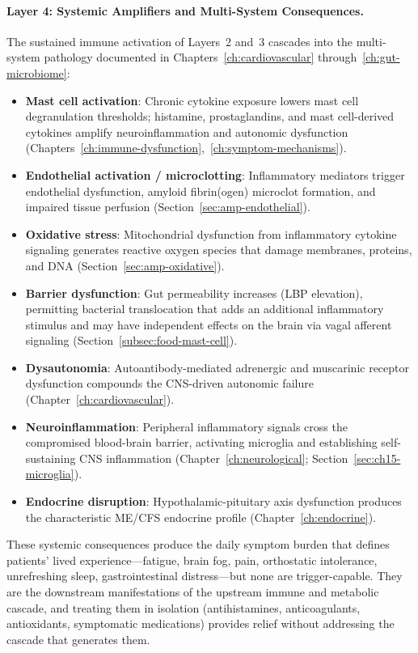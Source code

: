 \paragraph{Layer 4: Systemic Amplifiers and Multi-System Consequences.} The sustained immune activation of Layers~2 and~3 cascades into the multi-system pathology documented in Chapters~\ref{ch:cardiovascular} through~\ref{ch:gut-microbiome}:
\begin{itemize}
    \item \textbf{Mast cell activation}: Chronic cytokine exposure lowers mast cell degranulation thresholds; histamine, prostaglandins, and mast cell-derived cytokines amplify neuroinflammation and autonomic dysfunction (Chapters~\ref{ch:immune-dysfunction},~\ref{ch:symptom-mechanisms}).
    \item \textbf{Endothelial activation / microclotting}: Inflammatory mediators trigger endothelial dysfunction, amyloid fibrin(ogen) microclot formation, and impaired tissue perfusion (Section~\ref{sec:amp-endothelial}).
    \item \textbf{Oxidative stress}: Mitochondrial dysfunction from inflammatory cytokine signaling generates reactive oxygen species that damage membranes, proteins, and DNA (Section~\ref{sec:amp-oxidative}).
    \item \textbf{Barrier dysfunction}: Gut permeability increases (LBP elevation), permitting bacterial translocation that adds an additional inflammatory stimulus and may have independent effects on the brain via vagal afferent signaling (Section~\ref{subsec:food-mast-cell}).
    \item \textbf{Dysautonomia}: Autoantibody-mediated adrenergic and muscarinic receptor dysfunction compounds the CNS-driven autonomic failure (Chapter~\ref{ch:cardiovascular}).
    \item \textbf{Neuroinflammation}: Peripheral inflammatory signals cross the compromised blood-brain barrier, activating microglia and establishing self-sustaining CNS inflammation (Chapter~\ref{ch:neurological}; Section~\ref{sec:ch15-microglia}).
    \item \textbf{Endocrine disruption}: Hypothalamic-pituitary axis dysfunction produces the characteristic ME/CFS endocrine profile (Chapter~\ref{ch:endocrine}).
\end{itemize}

These systemic consequences produce the daily symptom burden that defines patients' lived experience---fatigue, brain fog, pain, orthostatic intolerance, unrefreshing sleep, gastrointestinal distress---but none are trigger-capable. They are the downstream manifestations of the upstream immune and metabolic cascade, and treating them in isolation (antihistamines, anticoagulants, antioxidants, symptomatic medications) provides relief without addressing the cascade that generates them.

